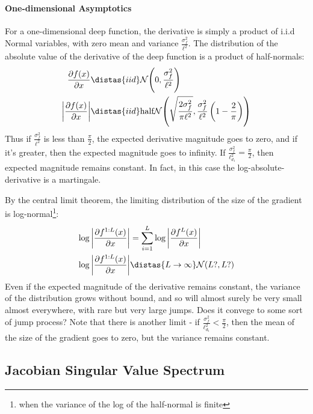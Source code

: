 \documentclass{article}
\begin{document}
\paragraph{One-dimensional Asymptotics}

For a one-dimensional deep function, the derivative is simply a product of i.i.d Normal variables, with zero mean and variance $\frac{\sigma^2_f}{\ell^2}$.  The distribution of the absolute value of the derivative of the deep function is a product of half-normals:
%
\begin{align}
\frac{\partial f(x)}{\partial x} & \distas{iid} \Nt{0}{\frac{\sigma^2_f}{\ell^2}} \\
\left| \frac{\partial f(x)}{\partial x} \right| & \distas{iid} \textnormal{half}\Nt{\sqrt{\frac{2 \sigma^2_f}{\pi\ell^2}}}{\frac{\sigma^2_f}{\ell^2} \left( 1 - \frac{2}{\pi} \right)}
\end{align}
%
Thus if $\frac{\sigma^2_f}{\ell^2}$ is less than $\frac{\pi}{2}$, the expected derivative magnitude goes to zero, and if it's greater, then the expected magnitude goes to infinity.  If $\frac{\sigma^2_f}{\ell_{d_1}^2} = \frac{\pi}{2}$, then expected magnitude remains constant.  In fact, in this case the log-absolute-derivative is a martingale.

By the central limit theorem, the limiting distribution of the size of the gradient is log-normal\footnote{when the variance of the log of the half-normal is finite}:
\begin{align}
\log \left| \frac{\partial f^{1:L}(x)}{\partial x} \right| & = \sum_{i=1}^L \log \left| \frac{\partial f^{L}(x)}{\partial x} \right| \\
\log \left| \frac{\partial f^{1:L}(x)}{\partial x} \right| & \distas{L \rightarrow \infty} \Nt{L ?}{L ?}
\end{align}
%
Even if the expected magnitude of the derivative remains constant, the variance of the distribution grows without bound, and so will almost surely be very small almost everywhere, with rare but very large jumps.  Does it convege to some sort of jump process?  Note that there is another limit - if $\frac{\sigma^2_f}{\ell_{d_1}^2} < \frac{\pi}{2}$, then the mean of the size of the gradient goes to zero, but the variance remains constant.

\subsection{Jacobian Singular Value Spectrum}
\end{document}
